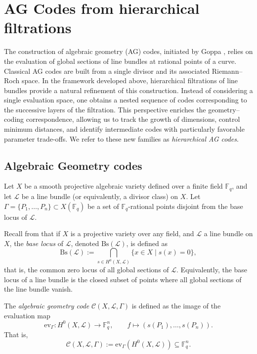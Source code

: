 \documentclass[14pt]{amsart}
\theoremstyle{plain}
\theoremstyle{definition}
\theoremstyle{remark}
\theoremstyle{example}
\def \F{\mathbb{F}}
\def \L{\mathcal{L}}
\def \C{\mathcal{C}}
\def \ev{\mathrm{ev}}
\begin{document}
\section{AG Codes from hierarchical filtrations}
\label{AG codes}



The construction of algebraic geometry (AG) codes, initiated by Goppa 
\cite{Go}, relies on the evaluation of global sections of line bundles 
at rational points of a curve. Classical AG codes are built from a single 
divisor and its associated Riemann--Roch space. In the framework developed 
above, hierarchical filtrations of line bundles provide a natural refinement 
of this construction. Instead of considering a single evaluation space, one 
obtains a nested sequence of codes corresponding to the successive layers of 
the filtration. This perspective enriches the geometry–coding correspondence, 
allowing us to track the growth of dimensions, control minimum distances, and 
identify intermediate codes with particularly favorable parameter trade-offs. 
We refer to these new families as \emph{hierarchical AG codes}.

\subsection*{Algebraic Geometry codes}
Let $X$ be a smooth projective algebraic variety defined over a finite field $\F_q$, and let $\L$ be a line bundle (or equivalently, a divisor class) on $X$. Let $\Gamma = \{P_1, \dots, P_n\} \subset X(\F_q)$ be a set of $\F_q$-rational points disjoint from the base locus of $\L$.

Recall from \cite{Ha, La} that if $X$ is a projective variety over any field, and $\L$ a line bundle on $X$, the \emph{base locus} of $\L$, denoted $\mathrm{Bs}(\L)$, is defined as
$$\mathrm{Bs}(\L):= \bigcap_{s \in H^0(X, \L)}\{x \in X\mid s(x)=0\},$$
that is, the common zero locus of all global sections of $\L$. Equivalently, the base locus of a line bundle is the closed subset of points where all global sections of the line bundle vanish.


The \emph{algebraic geometry code} $\C(X,\L,\Gamma)$ is defined as the image of the evaluation map
$$\ev_\Gamma\colon H^0(X,\L)\longrightarrow \F_q^n,\qquad f\mapsto(s(P_1),\dots,s(P_n)).$$
That is,
$$\C(X,\L,\Gamma):=\ev_\Gamma(H^0(X,\L))\subseteq \F_q^n.$$
\end{document}
